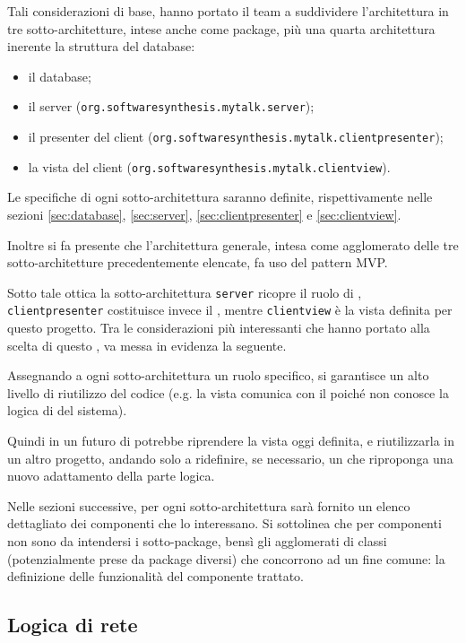 Tali considerazioni di base, hanno portato il team a suddividere l'architettura in tre sotto-architetture, intese anche come package, più una quarta architettura inerente la struttura del database:
\begin{itemize}
	\item il database;
	\item il server (\texttt{org.softwaresynthesis.mytalk.server});
	\item il presenter del client (\texttt{org.softwaresynthesis.mytalk.clientpresenter});
	\item la vista del client (\texttt{org.softwaresynthesis.mytalk.clientview}).
\end{itemize}

Le specifiche di ogni sotto-architettura saranno definite, rispettivamente nelle sezioni \vref{sec:database}, \vref{sec:server}, \vref{sec:clientpresenter} e \vref{sec:clientview}.

Inoltre si fa presente che l'architettura generale, intesa come agglomerato delle tre sotto-architetture precedentemente elencate, fa uso del pattern MVP\@.

Sotto tale ottica la sotto-architettura \texttt{server} ricopre il ruolo di , \texttt{clientpresenter} costituisce invece il , mentre \texttt{clientview} è la vista definita per questo progetto. Tra le considerazioni più interessanti che hanno portato alla scelta di questo , va messa in evidenza la seguente.

Assegnando a ogni sotto-architettura un ruolo specifico, si garantisce un alto livello di riutilizzo del codice (e.g. la vista comunica con il  poiché non conosce la logica di  del sistema).

Quindi in un futuro di potrebbe riprendere la vista oggi definita, e riutilizzarla in un altro progetto, andando solo a ridefinire, se necessario, un  che riproponga una nuovo adattamento della parte logica.

Nelle sezioni successive, per ogni sotto-architettura sarà fornito un elenco dettagliato dei componenti che lo interessano. Si sottolinea che per componenti non sono da intendersi i sotto-package, bensì gli agglomerati di classi (potenzialmente prese da package diversi) che concorrono ad un fine comune: la definizione delle funzionalità del componente trattato.
\clearpage

\subsection{Logica di rete}

